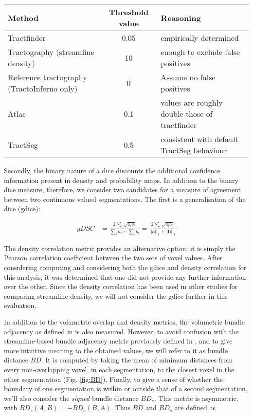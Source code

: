 \begin{table}[h!]
  \caption{}
  \label{tab:thresh}
  \small
  \begin{tabularx}{\textwidth}{>{\raggedright\arraybackslash}X c >{\raggedright\arraybackslash}X}
    \toprule
    Method    & Threshold value & Reasoning \\
    \midrule
    Tractfinder   & 0.05 & empirically determined \\
    Tractography (streamline density) & 10 & enough to exclude false positives \\
    Reference tractography (TractoInferno only) & 0 & Assume no false positives \\
    Atlas         & 0.1 & values are roughly double those of tractfinder \\
    TractSeg      & 0.5 & consistent with default TractSeg behaviour \\ \bottomrule
  \end{tabularx}
\end{table}

Secondly, the binary nature of a \gls{dice} discounts the additional confidence information present in density and probability maps.
In addition to the binary \gls{dice} measure, therefore, we consider two candidates for a measure of agreement between two continuous valued segmentations.
The first is a generalisation of the \gls{dice} (\gls{gdice}):

\begin{align}
  gDSC &= \frac{2 \sum_i \sqrt{a_ib_i} }{\sum_ia_i + \sum_ib_i}
  =  \frac{2 \sum_i \sqrt{a_ib_i} }{||\mathbf{a}||_1 + ||\mathbf{b}||_1}
\end{align}

The density correlation metric provides an alternative option:
it is simply the Pearson correlation coefficient between the two sets of voxel values.
After considering computing and considering both the \gls{gdice} and density correlation for this analysis, it was determined that one did not provide any further information over the other.
Since the density correlation has been used in other studies for comparing streamline density,\autocite{Radwan2022, Schilling2021a} we will not consider the \gls{gdice} further in this evaluation.

In addition to the volumetric overlap and density metrics, the volumetric bundle adjacency as defined in \textcite{Schilling2021a} is also measured.
However, to avoid confusion with the streamline-based bundle adjacency\autocite{Radwan2022, Garyfallidis2012, Rheault2022} metric previously defined in \textcite{Garyfallidis2012},
and to give more intuitive meaning to the obtained values, we will refer to it as bundle distance $BD$.
It is computed by taking the mean of minimum distances from every non-overlapping voxel, in each segmentation, to the closest voxel in the other segmentation (Fig. \ref{fig:BD}).
Finally, to give a sense of whether the boundary of one segmentation is within or outside that of a second segmentation, we'll also consider the \textit{signed} bundle distance $BD_s$.
This metric is asymmetric, with $BD_s (A,B) = -BD_s(B,A)$.
Thus $BD$ and $BD_s$ are defined as

